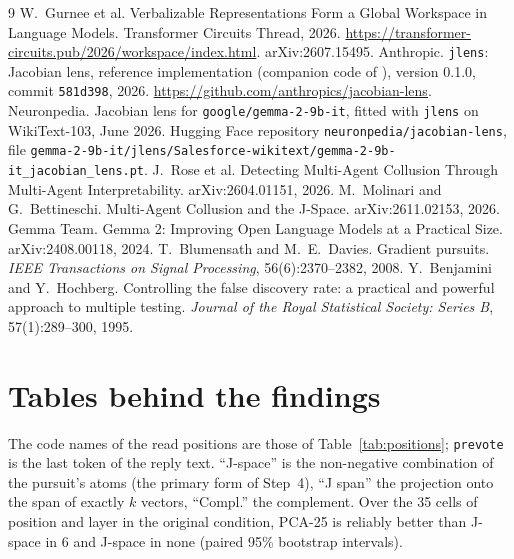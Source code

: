 \documentclass[11pt]{article}
\newcommand{\tok}[1]{\texttt{#1}}
\newcounter{finding}
\begin{document}
\begin{thebibliography}{9}
 W.~Gurnee et al. Verbalizable Representations Form a Global Workspace in Language Models.
Transformer Circuits Thread, 2026. \url{https://transformer-circuits.pub/2026/workspace/index.html}. arXiv:2607.15495.
 Anthropic. \texttt{jlens}: Jacobian lens, reference implementation (companion code of
\cite{gurnee2026workspace}), version 0.1.0, commit \texttt{581d398}, 2026.
\url{https://github.com/anthropics/jacobian-lens}.
 Neuronpedia. Jacobian lens for \texttt{google/gemma-2-9b-it}, fitted with \texttt{jlens} on
WikiText-103, June 2026. Hugging Face repository \texttt{neuronpedia/jacobian-lens}, file
\texttt{gemma-2-9b-it/jlens/Salesforce-wikitext/gemma-2-9b-it\_jacobian\_lens.pt}.
 J.~Rose et al. Detecting Multi-Agent Collusion Through Multi-Agent Interpretability.
arXiv:2604.01151, 2026.
 M.~Molinari and G.~Bettineschi. Multi-Agent Collusion and the J-Space. arXiv:2611.02153,
2026.
 Gemma Team. Gemma 2: Improving Open Language Models at a Practical Size. arXiv:2408.00118, 2024.
 T.~Blumensath and M.~E.~Davies. Gradient pursuits. \emph{IEEE Transactions on Signal Processing},
56(6):2370--2382, 2008.
 Y.~Benjamini and Y.~Hochberg. Controlling the false discovery rate: a practical and powerful
approach to multiple testing. \emph{Journal of the Royal Statistical Society: Series B}, 57(1):289--300, 1995.
\end{thebibliography}

\clearpage
\appendix
\section{Tables behind the findings}\label{app:tables}
The code names of the read positions are those of Table~\ref{tab:positions}; \tok{prevote} is the last token of the reply
text. ``J-space'' is the non-negative combination of the pursuit's atoms (the primary form of Step~4), ``J span'' the
projection onto the span of exactly $k$ vectors, ``Compl.'' the complement. Over the 35 cells of position and layer in the original condition, PCA-25 is
reliably better than J-space in 6 and J-space in none (paired 95\% bootstrap intervals).

\begin{table}[H]\centering\small
\resizebox{\linewidth}{!}{}
\caption{Finding~\ref{f:baselines}: the comparison at four subspace sizes. Core$\to$Transfer, original condition, last token,
band means; p95 is the 95th percentile of 200 draws.}
\label{tab:ksweep}
\end{table}
\end{document}
